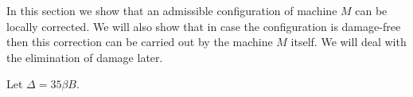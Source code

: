 \documentclass[12pt]{memoir}
\newcommand{\fld}[1]{\ensuremath{\textit{#1}}}
\def\B{B}
\newcommand{\D}{D}
\newcommand{\Plus}{\oplus}
\newcommand{\Minus}{\ominus}
\newcommand{\cArb}{\fld{cArb}}
\newcommand{\Core}{\fld{Core}}
\begin{document}
In this section we show that an admissible configuration of machine \( M \)
can be locally corrected.
We will also show that in case the configuration is damage-free then this correction
can be carried out by the machine \( M \) itself.
We will deal with the elimination of damage later.








\begin{definition}\label{def:Delta}
  Let \( \Delta=35\beta\B \).
\end{definition}
\end{document}
